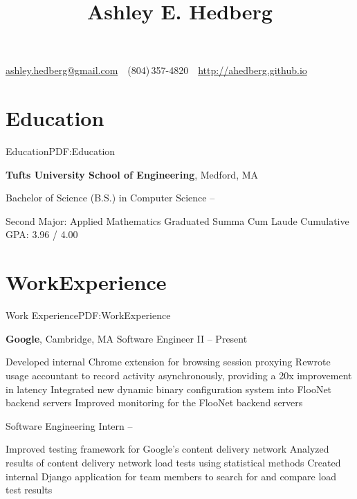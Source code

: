\documentclass[letterpaper,MMMyyyy,nonstop]{simpleresumecv}
\newcommand{\CVAuthor}{Ashley E. Hedberg}
\newcommand{\CVWebpage}{http://ahedberg.github.io}
\begin{document}

\title{\CVAuthor}

\begin{subtitle}
\href{mailto:ashley.hedberg@gmail.com}{ashley.hedberg@gmail.com}
\,\SubBulletSymbol\,
(804)\,357-4820
\,\SubBulletSymbol\,
\href{\CVWebpage}{\CVWebpage}
\end{subtitle}

\begin{body}


\section{Education}{Education}{PDF:Education}

\textbf{Tufts University School of Engineering}, Medford, MA

\GapNoBreak
\BulletItem
Bachelor of Science (B.S.) in Computer Science
\hfill
{} -- 
\begin{detail}
\SubBulletItem
Second Major: Applied Mathematics
\SubBulletItem
Graduated Summa Cum Laude
\SubBulletItem
Cumulative GPA: 3.96 / 4.00
\end{detail}


\section{Work\newline Experience}{Work Experience}{PDF:WorkExperience}

\textbf{Google}, Cambridge, MA
\GapNoBreak
\BulletItem
Software Engineer II
\hfill
{} -- Present
\begin{detail}
\SubBulletItem
Developed internal Chrome extension for browsing session proxying
\SubBulletItem
Rewrote usage accountant to record activity asynchronously, providing a 20x improvement in latency
\SubBulletItem
Integrated new dynamic binary configuration system into FlooNet backend servers
\SubBulletItem
Improved monitoring for the FlooNet backend servers
\end{detail}
\BulletItem
Software Engineering Intern
\hfill
{} -- 
\begin{detail}
\SubBulletItem
Improved testing framework for Google's content delivery network
\SubBulletItem
Analyzed results of content delivery network load tests using statistical methods
\SubBulletItem
Created internal Django application for team members to search for and compare load test results
\end{detail}


\end{body}
\end{document}

